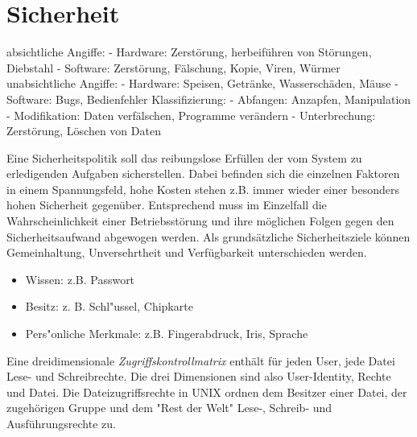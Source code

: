 \section{Sicherheit}


\begin{answer}
absichtliche Angiffe:
- Hardware:
Zerstörung, herbeiführen von Störungen, Diebstahl
- Software:
Zerstörung, Fälschung, Kopie, Viren, Würmer
unabsichtliche Angiffe:
- Hardware:
Speisen, Getränke, Wasserschäden, Mäuse
- Software:
Bugs, Bedienfehler
Klassifizierung:
- Abfangen: Anzapfen, Manipulation
- Modifikation: Daten verfälschen, Programme verändern
- Unterbrechung: Zerstörung, Löschen von Daten

\end{answer}

\begin{answer}
Eine Sicherheitspolitik soll das reibungslose Erfüllen der vom System zu erledigenden Aufgaben
sicherstellen. Dabei befinden sich die einzelnen Faktoren in einem Spannungsfeld, hohe Kosten
stehen z.B. immer wieder einer besonders hohen Sicherheit gegenüber. Entsprechend muss im
Einzelfall die Wahrscheinlichkeit einer Betriebsstörung und ihre möglichen Folgen gegen den Sicherheitsaufwand
abgewogen werden.
Als grundsätzliche Sicherheitsziele können Gemeinhaltung, Unversehrtheit und Verfügbarkeit unterschieden
werden.
\end{answer}

\begin{answer}

\begin{itemize}
\item Wissen: z.B. Passwort
\item Besitz: z. B. Schl"ussel, Chipkarte
\item Pers"onliche Merkmale: z.B. Fingerabdruck, Iris, Sprache
\end{itemize}

\end{answer}

\begin{answer}
Eine dreidimensionale \textit{Zugriffskontrollmatrix} enthält für jeden User, jede Datei Lese- und Schreibrechte.
Die drei Dimensionen sind also User-Identity, Rechte und Datei.
Die Dateizugriffsrechte in UNIX ordnen dem Besitzer einer Datei, der zugehörigen Gruppe und dem "Rest der Welt" Lese-, Schreib- und Ausführungsrechte zu.
\end{answer}

